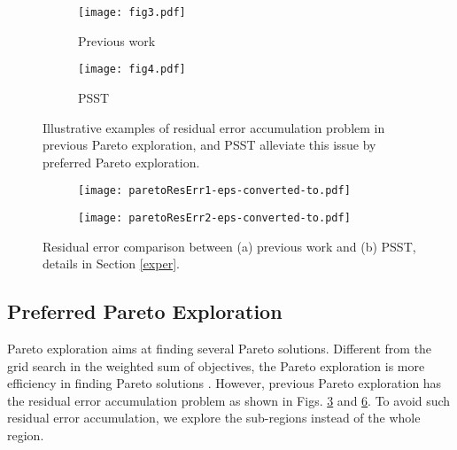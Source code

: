 \documentclass[final]{cvpr}
\begin{document}
\begin{figure}
	
	\begin{subfigure}{0.46\linewidth}
		\texttt{[image: fig3.pdf]}\label{ablation}
		\caption{Previous work}
	\end{subfigure}
	\begin{subfigure}{0.46\linewidth}
		\texttt{[image: fig4.pdf]}\label{entropy}
		\caption{PSST}
	\end{subfigure}
	\caption{Illustrative examples of residual error accumulation problem in previous Pareto exploration, and PSST alleviate this issue by preferred Pareto exploration. }\label{figproblem}
\end{figure}

\begin{figure}
	\begin{subfigure}{0.46\linewidth}
		\texttt{[image: paretoResErr1-eps-converted-to.pdf]}\label{ablation}
		\caption{}
	\end{subfigure}
	\begin{subfigure}{0.46\linewidth}
		\texttt{[image: paretoResErr2-eps-converted-to.pdf]}\label{entropy}
		\caption{}
	\end{subfigure}
	\caption{Residual error comparison between (a) previous work and (b) PSST, details in Section \ref{exper}.}\label{figExpproblem}
\end{figure}

\subsection{Preferred Pareto Exploration}\label{paretoEx}

Pareto exploration aims at finding several Pareto solutions.
Different from the grid search in the weighted sum of objectives, the Pareto exploration is more efficiency in finding Pareto solutions \cite{ma2020continuous}.
However, previous Pareto exploration has the residual error accumulation problem as shown in Figs. \ref{figproblem} and \ref{figExpproblem}. 
To avoid such residual error accumulation, we explore the sub-regions instead of the whole region.
\end{document}
